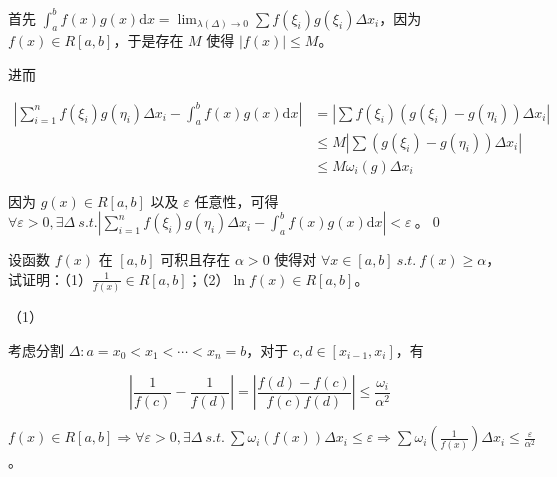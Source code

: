 首先 $\displaystyle \int _{a}^{b} f( x) g( x)\mathrm{d} x=\lim _{\lambda ( \Delta )\rightarrow 0}\sum f( \xi _{i}) g( \xi _{i}) \Delta x_{i}$，因为 $\displaystyle f( x) \in R[ a,b]$，于是存在 $\displaystyle M$ 使得 $\displaystyle |f( x) |\leqslant M$。

进而


\begin{equation*}
\begin{aligned}
	\left| \sum _{i=1}^{n} f( \xi _{i}) g( \eta _{i}) \Delta x_{i} -\int _{a}^{b} f( x) g( x)\mathrm{d} x\right|  & =\left| \sum f( \xi _{i})( g( \xi _{i}) -g( \eta _{i})) \Delta x_{i}\right| \\
	& \leqslant M\left| \sum ( g( \xi _{i}) -g( \eta _{i})) \Delta x_{i}\right| \\
	& \leqslant M\omega _{i}( g) \Delta x_{i}
\end{aligned}
\end{equation*}

因为 $\displaystyle g( x) \in R[ a,b]$ 以及 $\displaystyle \varepsilon $ 任意性，可得 $\displaystyle \forall \varepsilon  >0,\exists \Delta \ s.t.\left| \sum _{i=1}^{n} f( \xi _{i}) g( \eta _{i}) \Delta x_{i} -\int _{a}^{b} f( x) g( x)\mathrm{d} x\right| < \varepsilon \ $。\qed 





\begin{ques}
	设函数 $\displaystyle f( x)$ 在 $\displaystyle [ a,b]$ 可积且存在 $\displaystyle \alpha  >0$ 使得对 $\displaystyle \forall x\in [ a,b] \ s.t.\ f( x) \geqslant \alpha $，试证明：（1）$\displaystyle \frac{1}{f( x)} \in R[ a,b]$；（2）$\displaystyle \ln f( x) \in R[ a,b]$。

\end{ques}




（1）

考虑分割 $\displaystyle \Delta :a=x_{0} < x_{1} < \cdots < x_{n} =b$，对于 $\displaystyle c,d\in [ x_{i-1} ,x_{i}]$，有


\begin{equation*}
\left| \frac{1}{f( c)} -\frac{1}{f( d)}\right| =\left| \frac{f( d) -f( c)}{f( c) f( d)}\right| \leqslant \frac{\omega _{i}}{\alpha ^{2}}
\end{equation*}


$\displaystyle f( x) \in R[ a,b] \Rightarrow \forall \varepsilon  >0,\exists \Delta \ s.t.\ \sum \omega _{i}( f( x)) \Delta x_{i} \leqslant \varepsilon \Rightarrow \sum \omega _{i}\left(\frac{1}{f( x)}\right) \Delta x_{i} \leqslant \frac{\varepsilon }{\alpha ^{2}}$。

